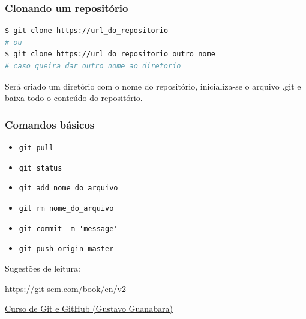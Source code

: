 \begin{frame}[fragile]
\frametitle{Clonando um repositório}
\begin{lstlisting}[language=bash, label=lst-git-repo2, caption={Clonando um repositório.}, postbreak=\mbox{$\hookrightarrow$\space}, basicstyle=\fontsize{8}{10}\selectfont\ttfamily]
$ git clone https://url_do_repositorio
# ou
$ git clone https://url_do_repositorio outro_nome
# caso queira dar outro nome ao diretorio
\end{lstlisting}

Será criado um diretório com o nome do repositório, inicializa-se o arquivo .git
e baixa todo o conteúdo do repositório.
\end{frame}


\begin{frame}[fragile]
\frametitle{Comandos básicos}

\begin{itemize}
\item \verb|git pull|
\item \verb|git status|
\item \verb|git add nome_do_arquivo|
\item \verb|git rm nome_do_arquivo|
\item \verb|git commit -m 'message'|
\item \verb|git push origin master|
\end{itemize}

\end{frame}



\begin{frame}
Sugestões de leitura: 
\vspace{2ex}

\url{https://git-scm.com/book/en/v2}

\vspace{3ex}
\href{https://www.youtube.com/watch?v=xEKo29OWILE&list=PLHz_AreHm4dm7ZULPAmadvNhH6vk9oNZA}{Curso de Git e GitHub (Gustavo Guanabara)}

\end{frame}


